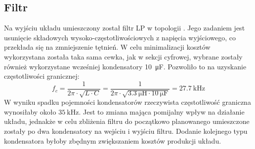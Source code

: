 \documentclass[11pt]{article}
\begin{document}
\subsection{Filtr}
Na wyjściu układu umieszczony został filtr LP w topologii \Pi. Jego zadaniem jest usunięcie składowych wysoko-częstotliwościowych z napięcia wyjściowego, co przekłada się na zmniejszenie tętnień. W celu minimalizacji kosztów wykorzystana została taka sama cewka, jak w sekcji cyfrowej, wybrane zostały również wykorzystane wcześniej kondensatory \SI{10}{\micro\farad}. Pozwoliło to na uzyskanie częstotliwości granicznej: $$f_c = \frac{1}{2\pi \cdot \sqrt{L \cdot C}} = \frac{1}{2\pi \cdot \sqrt{\SI{3.3}{\micro\henry} \cdot \SI{10}{\micro\farad}}} = \SI{27.7}{\kilo\hertz}$$
W wyniku spadku pojemności kondensatorów rzeczywista częstotliwość graniczna wynosiłaby około $\SI{35}{\kilo\hertz}$. Jest to zmiana mająca pomijalny wpływ na działanie układu, jednakże w celu zbliżenia filtru do początkowo planowanego umieszczone zostały po dwa kondensatory na wejściu i wyjściu filtru. Dodanie kolejnego typu kondensatora byłoby zbędnym zwiększaniem kosztów produkcji układu.
\end{document}
